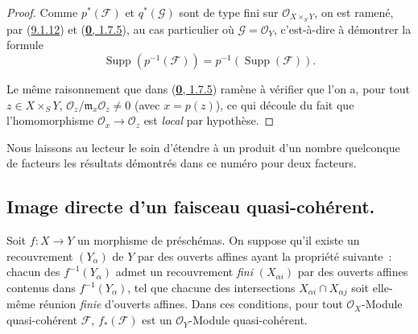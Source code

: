 \begin{proof}
Comme $p^*(\mathscr{F})$ et $q^*(\mathscr{G})$ sont de type fini sur
$\mathscr{O}_{X\times_S Y}$, on est ramené, par
(\hyperref[I.9.1.12-fr]{9.1.12}) et
(\hyperref[0.1.7.5-fr]{\textbf{0}, 1.7.5}), au cas particulier où
$\mathscr{G}=\mathscr{O}_Y$, c'est-à-dire à démontrer la formule
\[
  \operatorname{Supp}(p^{-1}(\mathscr{F}))
  =p^{-1}(\operatorname{Supp}(\mathscr{F})).
  \tag{9.1.13.1}\label{I.9.1.13.1-fr}
\]

Le même raisonnement que dans (\hyperref[0.1.7.5-fr]{\textbf{0}, 1.7.5}) ramène à
vérifier que l'on a, pour tout $z\in X\times_S Y$,
$\mathscr{O}_z/\mathfrak{m}_x\mathscr{O}_z\neq0$ (avec $x=p(z)$), ce qui
découle du fait que l'homomorphisme
$\mathscr{O}_x\to\mathscr{O}_z$ est \emph{local} par hypothèse.
\end{proof}

Nous laissons au lecteur le soin d'étendre à un produit d'un nombre
quelconque de facteurs les résultats démontrés dans ce numéro pour deux
facteurs.

\subsection{Image directe d'un faisceau quasi-cohérent.}
\label{subsection:I.9.2-fr}

\begin{proposition}[9.2.1]
\label{I.9.2.1-fr}
Soit $f:X\to Y$ un morphisme de préschémas. On suppose qu'il existe un
recouvrement $(Y_\alpha)$ de $Y$ par des ouverts affines ayant la propriété
suivante~: chacun des $f^{-1}(Y_\alpha)$ admet un recouvrement \emph{fini}
$(X_{\alpha i})$ par des ouverts affines contenus dans
$f^{-1}(Y_\alpha)$, tel que chacune des intersections
$X_{\alpha i}\cap X_{\alpha j}$ soit elle-même réunion \emph{finie} d'ouverts
affines. Dans ces conditions, pour tout $\mathscr{O}_X$-Module
quasi-cohérent $\mathscr{F}$, $f_*(\mathscr{F})$ est un
$\mathscr{O}_Y$-Module quasi-cohérent.
\end{proposition}

